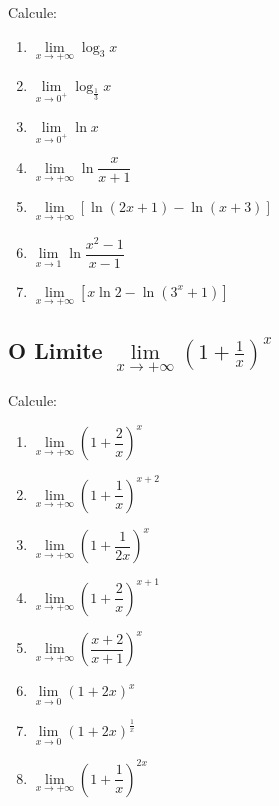 \begin{exercicio}[4]
Calcule:
\begin{enumerate}[label=\alph*)]
    \item $\lim\limits_{x \to +\infty} \log_3 x$
    \item $\lim\limits_{x \to 0^+} \log_{\frac{1}{3}} x$
    \item $\lim\limits_{x \to 0^+} \ln x$
    \item $\lim\limits_{x \to +\infty} \ln\dfrac{x}{x + 1}$
    \item $\lim\limits_{x \to +\infty} [\ln(2x + 1) - \ln(x + 3)]$
    \item $\lim\limits_{x \to 1} \ln\dfrac{x^2 - 1}{x - 1}$
    \item $\lim\limits_{x \to +\infty} [x\ln 2 - \ln(3^x + 1)]$
\end{enumerate}
\end{exercicio}

\clearpage

\subsection{O Limite $\lim\limits_{x \to +\infty} \left(1 + \frac{1}{x}\right)^x$}

\begin{exercicio}[1]
Calcule:
\begin{enumerate}[label=\alph*)]
    \item $\lim\limits_{x \to +\infty} \left(1 + \dfrac{2}{x}\right)^{\!x}$
    \item $\lim\limits_{x \to +\infty} \left(1 + \dfrac{1}{x}\right)^{\!x+2}$
    \item $\lim\limits_{x \to +\infty} \left(1 + \dfrac{1}{2x}\right)^{\!x}$
    \item $\lim\limits_{x \to +\infty} \left(1 + \dfrac{2}{x}\right)^{\!x+1}$
    \item $\lim\limits_{x \to +\infty} \left(\dfrac{x + 2}{x + 1}\right)^{\!x}$
    \item $\lim\limits_{x \to 0} (1 + 2x)^x$
    \item $\lim\limits_{x \to 0} (1 + 2x)^{\frac{1}{x}}$
    \item $\lim\limits_{x \to +\infty} \left(1 + \dfrac{1}{x}\right)^{\!2x}$
\end{enumerate}
\end{exercicio}

